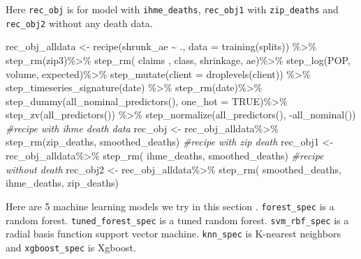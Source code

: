 \documentclass[
]{article}
\newenvironment{Shaded}{\begin{snugshade}}{\end{snugshade}}
\newcommand{\AttributeTok}[1]{\textcolor[rgb]{0.77,0.63,0.00}{#1}}
\newcommand{\CommentTok}[1]{\textcolor[rgb]{0.56,0.35,0.01}{\textit{#1}}}
\newcommand{\ConstantTok}[1]{\textcolor[rgb]{0.00,0.00,0.00}{#1}}
\newcommand{\FunctionTok}[1]{\textcolor[rgb]{0.00,0.00,0.00}{#1}}
\newcommand{\NormalTok}[1]{#1}
\newcommand{\OtherTok}[1]{\textcolor[rgb]{0.56,0.35,0.01}{#1}}
\newcommand{\SpecialCharTok}[1]{\textcolor[rgb]{0.00,0.00,0.00}{#1}}
\begin{document}
Here \texttt{rec\_obj} is for model with \texttt{ihme\_deaths},
\texttt{rec\_obj1} with \texttt{zip\_deaths} and \texttt{rec\_obj2}
without any death data.

\begin{Shaded}
\begin{Highlighting}[]
\NormalTok{rec\_obj\_alldata }\OtherTok{\textless{}{-}}
    \FunctionTok{recipe}\NormalTok{(shrunk\_ae }\SpecialCharTok{\textasciitilde{}}\NormalTok{ ., }\AttributeTok{data =} \FunctionTok{training}\NormalTok{(splits)) }\SpecialCharTok{\%\textgreater{}\%}
    \FunctionTok{step\_rm}\NormalTok{(zip3)}\SpecialCharTok{\%\textgreater{}\%}
    \FunctionTok{step\_rm}\NormalTok{( claims , class, shrinkage, ae)}\SpecialCharTok{\%\textgreater{}\%}
    \FunctionTok{step\_log}\NormalTok{(POP, volume, expected)}\SpecialCharTok{\%\textgreater{}\%}
    \FunctionTok{step\_mutate}\NormalTok{(}\AttributeTok{client =} \FunctionTok{droplevels}\NormalTok{(client)) }\SpecialCharTok{\%\textgreater{}\%}
    \FunctionTok{step\_timeseries\_signature}\NormalTok{(date) }\SpecialCharTok{\%\textgreater{}\%}
    \FunctionTok{step\_rm}\NormalTok{(date)}\SpecialCharTok{\%\textgreater{}\%}
    \FunctionTok{step\_dummy}\NormalTok{(}\FunctionTok{all\_nominal\_predictors}\NormalTok{(), }\AttributeTok{one\_hot =} \ConstantTok{TRUE}\NormalTok{)}\SpecialCharTok{\%\textgreater{}\%}
    \FunctionTok{step\_zv}\NormalTok{(}\FunctionTok{all\_predictors}\NormalTok{()) }\SpecialCharTok{\%\textgreater{}\%}
    \FunctionTok{step\_normalize}\NormalTok{(}\FunctionTok{all\_predictors}\NormalTok{(), }\SpecialCharTok{{-}}\FunctionTok{all\_nominal}\NormalTok{())}
\CommentTok{\#recipe with ihme death data}
\NormalTok{rec\_obj }\OtherTok{\textless{}{-}}
\NormalTok{    rec\_obj\_alldata}\SpecialCharTok{\%\textgreater{}\%}
    \FunctionTok{step\_rm}\NormalTok{(zip\_deaths, smoothed\_deaths)}
\CommentTok{\#recipe with zip death}
\NormalTok{rec\_obj1 }\OtherTok{\textless{}{-}}
\NormalTok{    rec\_obj\_alldata}\SpecialCharTok{\%\textgreater{}\%}
    \FunctionTok{step\_rm}\NormalTok{( ihme\_deaths, smoothed\_deaths)}
\CommentTok{\#recipe without  death}
\NormalTok{rec\_obj2 }\OtherTok{\textless{}{-}}
\NormalTok{    rec\_obj\_alldata}\SpecialCharTok{\%\textgreater{}\%}
    \FunctionTok{step\_rm}\NormalTok{( smoothed\_deaths, ihme\_deaths, zip\_deaths)}
\end{Highlighting}
\end{Shaded}

Here are 5 machine learning models we try in this section .
\texttt{forest\_spec} is a random forest. \texttt{tuned\_forest\_spec}
is a tuned random forest. \texttt{svm\_rbf\_spec} is a radial basis
function support vector machine. \texttt{knn\_spec} is K-nearest
neighbors and \texttt{xgboost\_spec} is Xgboost.
\end{document}
